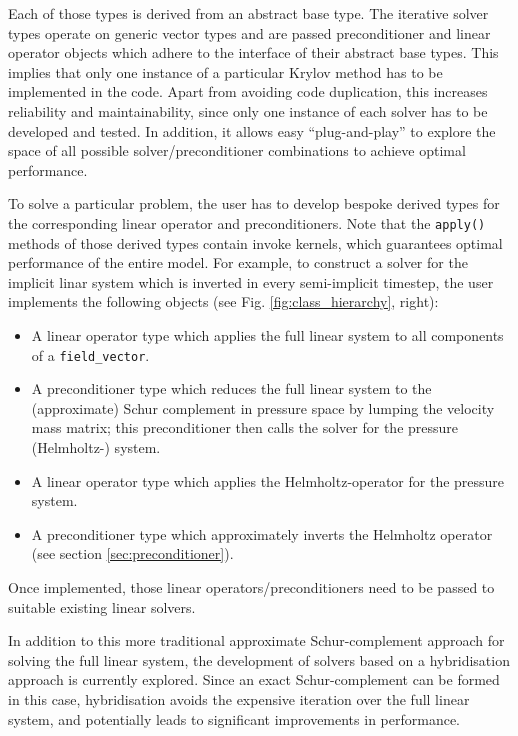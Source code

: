 \documentclass[times]{elsarticle}
\begin{document}
Each of those types is derived from an abstract base type. The iterative solver types operate on generic vector types and are passed preconditioner and linear operator objects which adhere to the interface of their abstract base types.  This implies that only one instance of a particular Krylov method has to be implemented in the code. Apart from avoiding code duplication, this increases reliability and maintainability, since only one instance of each solver has to be developed and tested. In addition, it allows easy ``plug-and-play'' to explore the space of all possible solver/preconditioner combinations to achieve optimal performance.

To solve a particular problem, the user has to develop bespoke derived types for the corresponding linear operator and preconditioners. Note that the \texttt{apply()} methods of those derived types contain invoke kernels, which guarantees optimal performance of the entire model. For example, to construct a solver for the implicit linar system which is inverted in every semi-implicit timestep, the user implements the following objects (see Fig. \ref{fig:class_hierarchy}, right):
\begin{itemize}
\item A linear operator type which applies the full linear system to all components of a \texttt{field\_vector}.
\item A preconditioner type which reduces the full linear system to the (approximate) Schur complement in pressure space by lumping the velocity mass matrix; this preconditioner then calls the solver for the pressure (Helmholtz-) system.
\item A linear operator type which applies the Helmholtz-operator for the pressure system.
\item A preconditioner type which approximately inverts the Helmholtz operator (see section \ref{sec:preconditioner}).
\end{itemize}
Once implemented, those linear operators/preconditioners need to be passed to suitable existing linear solvers.

In addition to this more traditional approximate Schur-complement approach for solving the full linear system, the development of solvers based on a hybridisation approach is currently explored. Since an exact Schur-complement can be formed in this case, hybridisation avoids the expensive iteration over the full linear system, and potentially leads to significant improvements in performance.
\end{document}
